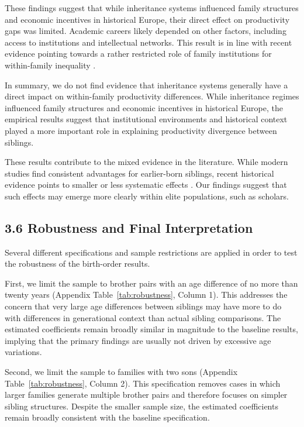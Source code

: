 These findings suggest that while inheritance systems influenced family structures and economic incentives in historical Europe, their direct effect on productivity gaps was limited. Academic careers likely depended on other factors, including access to institutions and intellectual networks. This result is in line with recent evidence pointing towards a rather restricted role of family institutions for within-family inequality \citep{Gobbi2025}.

In summary, we do not find evidence that inheritance systems generally have a direct impact on within-family productivity differences. While inheritance regimes influenced family structures and economic incentives in historical Europe, the empirical results suggest that institutional environments and historical context played a more important role in explaining productivity divergence between siblings.

These results contribute to the mixed evidence in the literature. While modern studies find consistent advantages for earlier-born siblings, recent historical evidence points to smaller or less systematic effects \citep{ClarkCummins2024}. Our findings suggest that such effects may emerge more clearly within elite populations, such as scholars.


\FloatBarrier


\FloatBarrier

\subsection*{3.6 Robustness and Final Interpretation}

Several different specifications and sample restrictions are applied in order to test the robustness of the birth-order results.

First, we limit the sample to brother pairs with an age difference of no more than twenty years (Appendix Table~\ref{tab:robustness}, Column 1). This addresses the concern that very large age differences between siblings may have more to do with differences in generational context than actual sibling comparisons. The estimated coefficients remain broadly similar in magnitude to the baseline results, implying that the primary findings are usually not driven by excessive age variations. 

Second, we limit the sample to families with two sons (Appendix Table~\ref{tab:robustness}, Column 2). This specification removes cases in which larger families generate multiple brother pairs and therefore focuses on simpler sibling structures.  Despite the smaller sample size, the estimated coefficients remain broadly consistent with the baseline specification.

